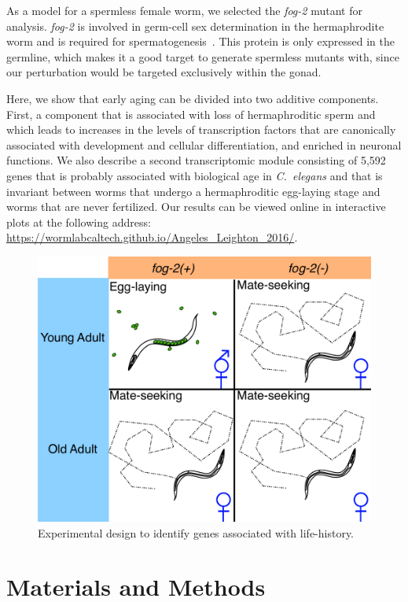 \documentclass[9pt,twocolumn,twoside]{gsag3jnl}
\newcommand{\cel}{\emph{C.~elegans}}
\newcommand{\fog}{\emph{fog-2}}
\newcommand{\agen}{5,592}
\newcommand{\website}{\url{https://wormlabcaltech.github.io/Angeles_Leighton_2016/}}
\begin{document}
As a model for a spermless female worm, we selected the \fog{} mutant for analysis. \fog{} is involved in germ-cell sex determination in the hermaphrodite worm and is required for spermatogenesis~\citep{Schedl1988,Clifford2000}. This protein is only expressed in the germline, which makes it a good target to generate spermless mutants with, since our perturbation would be targeted exclusively within the gonad.

Here, we show that early aging can be divided into two additive components. First, a component that is associated with loss of hermaphroditic sperm and which leads to increases in the levels of transcription factors that are canonically associated with development and cellular differentiation, and enriched in neuronal functions. We also describe a second transcriptomic module consisting of \agen{} genes that is probably associated with biological age in \cel{} and that is invariant between worms that undergo a hermaphroditic egg-laying stage and worms that are never fertilized. Our results can be viewed online in interactive plots at the following address: \website{}.

\begin{figure}[htbp]
\renewcommand{\familydefault}{\sfdefault}\normalfont{}
\centering
\includegraphics[width=\linewidth]{../output/figs/final_figs/worm_life_fog2_vs_n2.pdf}
\caption{Experimental design to identify genes associated with life-history.
}%
\label{fig:wormlife}
\end{figure}


\section{Materials and Methods}
\label{sec:materials_methods}
\end{document}
